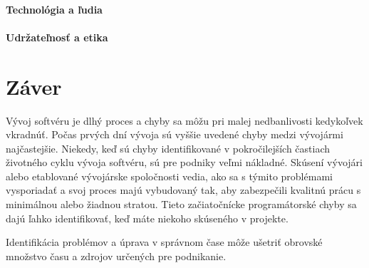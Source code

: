 \documentclass[10pt,twoside,slovak,a4paper]{article}
\begin{document}
\paragraph{Technológia a ľudia}


\paragraph{Udržateľnosť a etika}








\section{Záver}
Vývoj softvéru je dlhý proces a chyby sa môžu pri malej nedbanlivosti kedykoľvek vkradnúť. Počas prvých dní vývoja sú vyššie uvedené chyby medzi vývojármi najčastejšie. Niekedy, keď sú chyby identifikované v pokročilejších častiach životného cyklu vývoja softvéru, sú pre podniky veľmi nákladné. Skúsení vývojári alebo etablované vývojárske spoločnosti vedia, ako sa s týmito problémami vysporiadať a svoj proces majú vybudovaný tak, aby zabezpečili kvalitnú prácu s minimálnou alebo žiadnou stratou. Tieto začiatočnícke programátorské chyby sa dajú ľahko identifikovať, keď máte niekoho skúseného v projekte.

Identifikácia problémov a úprava v správnom čase môže ušetriť obrovské množstvo času a zdrojov určených pre podnikanie.




\nocite{*}		%

\end{document}
